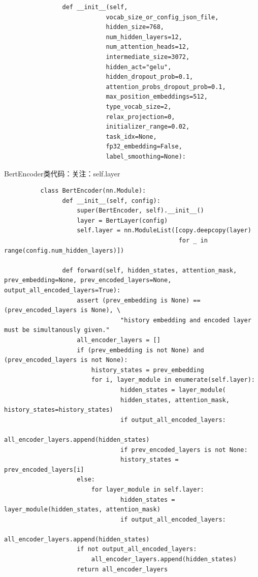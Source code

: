 \documentclass[a4paper]{article}
\begin{document}
\begin{sloppypar}
\begin{lstlisting}
                def __init__(self,
                            vocab_size_or_config_json_file,
                            hidden_size=768,
                            num_hidden_layers=12,
                            num_attention_heads=12,
                            intermediate_size=3072,
                            hidden_act="gelu",
                            hidden_dropout_prob=0.1,
                            attention_probs_dropout_prob=0.1,
                            max_position_embeddings=512,
                            type_vocab_size=2,
                            relax_projection=0,
                            initializer_range=0.02,
                            task_idx=None,
                            fp32_embedding=False,
                            label_smoothing=None):
    \end{lstlisting}

    BertEncoder类代码：关注：self.layer

    \begin{lstlisting}
          class BertEncoder(nn.Module):
                def __init__(self, config):
                    super(BertEncoder, self).__init__()
                    layer = BertLayer(config)
                    self.layer = nn.ModuleList([copy.deepcopy(layer)
                                                for _ in range(config.num_hidden_layers)])
          
                def forward(self, hidden_states, attention_mask, prev_embedding=None, prev_encoded_layers=None, output_all_encoded_layers=True):
                    assert (prev_embedding is None) == (prev_encoded_layers is None), \
                                "history embedding and encoded layer must be simultanously given."
                    all_encoder_layers = []
                    if (prev_embedding is not None) and (prev_encoded_layers is not None):
                        history_states = prev_embedding
                        for i, layer_module in enumerate(self.layer):
                                hidden_states = layer_module(
                                hidden_states, attention_mask, history_states=history_states)
                                if output_all_encoded_layers:
                                all_encoder_layers.append(hidden_states)
                                if prev_encoded_layers is not None:
                                history_states = prev_encoded_layers[i]
                    else:
                        for layer_module in self.layer:
                                hidden_states = layer_module(hidden_states, attention_mask)
                                if output_all_encoded_layers:
                                all_encoder_layers.append(hidden_states)
                    if not output_all_encoded_layers:
                        all_encoder_layers.append(hidden_states)
                    return all_encoder_layers
          \end{lstlisting}


\end{sloppypar}
\end{document}
